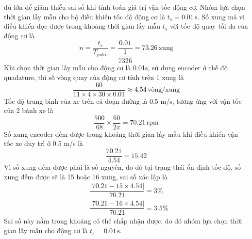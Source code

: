                đủ lớn để giảm thiểu sai số khi tính toán giá trị vận tốc động cơ. Nhóm lựa chọn thời gian lấy mẫu cho bộ điều khiển tốc độ động cơ là $t_s = 0.01 \,\mathrm{s}$. Số xung mà vi điều khiển đọc được trong khoảng thời gian lấy mẫu $t_s$ với tốc độ quay tối đa của động cơ là 
               \begin{equation*}
                    n = \dfrac{t_s}{T_{\text{pulse}}} = \dfrac{0.01}{\dfrac{1}{7326}} = 73.26 \,\mathrm{xung}
               \end{equation*}
               \hspace*{0.6cm}Khi chọn thời gian lấy mẫu cho động cơ là 0.01s, sử dụng encoder ở chế độ quadature, thì số vòng quay của động cơ tính trên 1 xung là
               \begin{equation*}
                    \dfrac{60}{11 \times 4 \times 30 \times 0.01} \approx 4.54 \,\text{vòng/xung}
               \end{equation*}
               \hspace*{0.6cm}Tốc độ trung bình của xe trên cả đoạn đường là 0.5 m/s, tương ứng với vận tốc của 2 bánh xe là
               \begin{equation*}
                    \dfrac{500}{68} \times \dfrac{60}{2 \pi} = 70.21 \,\mathrm{rpm}
               \end{equation*}
               \hspace*{0.6cm}Số xung encoder đếm được trong khoảng thời gian lấy mẫu khi điều khiển vận tốc xe duy trì ở 0.5 m/s là
               \begin{equation*}
                    \dfrac{70.21}{4.54} = 15.42
               \end{equation*}
               \hspace*{0.6cm}Vì số xung đếm được phải là số nguyên, do đó tại trạng thái ổn định tốc độ, số xung đếm được sẽ là 15 hoặc 16 xung, sai số xác lập là
               \begin{align*}
                    &\dfrac{|70.21 - 15 \times 4.54|}{70.21} = 3 \%\\
                    &\dfrac{|70.21 - 16 \times 4.54|}{70.21} = 3.5 \%
               \end{align*}
               \hspace*{0.6cm}Sai số này nằm trong khoảng có thể chấp nhận được, do đó nhóm lựa chọn thời gian lấy mẫu cho động cơ là $t_s = 0.01 \,\mathrm{s}$.


               
